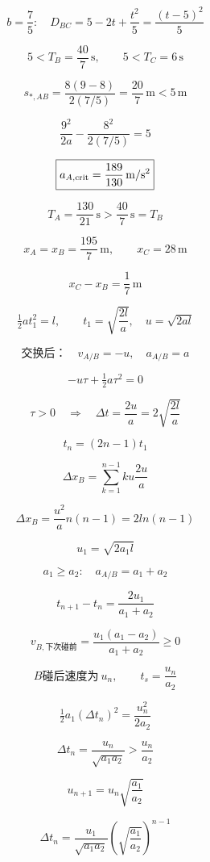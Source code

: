 \documentclass[12pt]{article}
\begin{document}
\[
b=\frac75:\quad D_{BC}=5-2t+\frac{t^2}{5}=\frac{(t-5)^2}{5}
\]

\[
5< T_B=\frac{40}{7}\,\mathrm s,\qquad5<T_C=6\,\mathrm s
\]

\[
s_{*,AB}=\frac{8(9-8)}{2(7/5)}=\frac{20}{7}\,\mathrm m<5\,\mathrm m
\]

\[
\frac{9^2}{2a}-\frac{8^2}{2(7/5)}=5
\]

\[
\boxed{a_{A,\rm crit}=\frac{189}{130}\,\mathrm{m/s^2}}
\]

\[
T_A=\frac{130}{21}\,\mathrm s>\frac{40}{7}\,\mathrm s=T_B
\]

\[
x_A=x_B=\frac{195}{7}\,\mathrm m,\qquad x_C=28\,\mathrm m
\]

\[
x_C-x_B=\frac17\,\mathrm m
\]

\[
\tfrac12at_1^2=l,\qquad t_1=\sqrt{\frac{2l}{a}},\quad u=\sqrt{2al}
\]

\[
\text{交换后：}\quad v_{A/B}=-u,\quad a_{A/B}=a
\]

\[
-u\tau+\tfrac12a\tau^2=0
\]

\[
\tau>0\quad\Longrightarrow\quad\boxed{\Delta t=\frac{2u}{a}=2\sqrt{\frac{2l}{a}}}
\]

\[
t_n=(2n-1)t_1
\]

\[
\Delta x_B=\sum_{k=1}^{n-1}ku\frac{2u}{a}
\]

\[
\boxed{\Delta x_B=\frac{u^2}{a}n(n-1)=2ln(n-1)}
\]

\[
u_1=\sqrt{2a_1l}
\]

\[
a_1\ge a_2:\quad a_{A/B}=a_1+a_2
\]

\[
\boxed{t_{n+1}-t_n=\frac{2u_1}{a_1+a_2}}
\]

\[
v_{B,\text{下次碰前}}=\frac{u_1(a_1-a_2)}{a_1+a_2}\ge0
\]

\[
B\text{碰后速度为}\ u_n,\qquad t_s=\frac{u_n}{a_2}
\]

\[
\tfrac12a_1(\Delta t_n)^2=\frac{u_n^2}{2a_2}
\]

\[
\Delta t_n=\frac{u_n}{\sqrt{a_1a_2}}>\frac{u_n}{a_2}
\]

\[
u_{n+1}=u_n\sqrt{\frac{a_1}{a_2}}
\]

\[
\boxed{\Delta t_n=\frac{u_1}{\sqrt{a_1a_2}}\left(\sqrt{\frac{a_1}{a_2}}\right)^{n-1}}
\]
\end{document}
